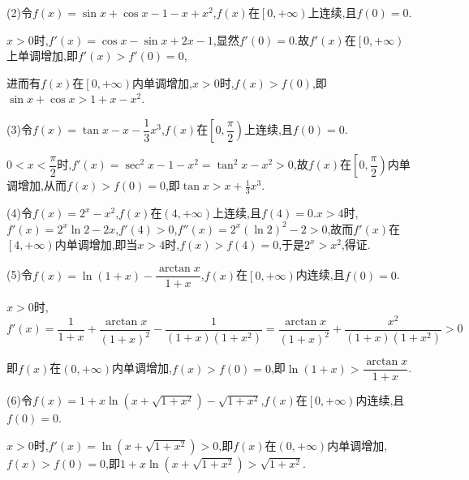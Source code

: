 (2)令$f\left( x \right) = \sin x + \cos x - 1 - x + {x^2}$,$f\left( x \right)$在$\left[ {0, + \infty } \right)$上连续,且$f\left( 0 \right) = 0$.

$x > 0$时,$f'\left( x \right) = \cos x - \sin x + 2x - 1$,显然$f'\left( 0 \right) = 0$.故$f'\left( x \right)$在$\left[ {0, + \infty } \right)$上单调增加,即$f'\left( x \right) > f'\left( 0 \right) = 0$,

进而有$f\left( x \right)$在$\left[ {0, + \infty } \right)$内单调增加,$x > 0$时,$f\left( x \right) > f\left( 0 \right)$,即$\sin x + \cos x > 1 + x - {x^2}$.

(3)令$f\left( x \right) = \tan x - x - \dfrac{1}{3}{x^3}$,$f(x)$在$\left[ {0,\dfrac{\pi }{2}} \right)$上连续,且$f\left( 0 \right) = 0$.

$0 < x < \dfrac{\pi }{2}$时,$f'\left( x \right) = {\sec ^2}x - 1 - {x^2} = {\tan ^2}x - {x^2} > 0$,故$f(x)$在$\left[ {0,\dfrac{\pi }{2}} \right)$内单调增加,从而$f\left( x \right) > f\left( 0 \right) = 0$,即$\tan x > x + \frac{1}{3}{x^3}$.

(4)令$f\left( x \right) = {2^x} - {x^2}$,$f(x)$在$\left( {4, + \infty } \right)$上连续,且$f\left( 4 \right) = 0$.$x > 4$时,$f'\left( x \right) = {2^x}\ln 2 - 2x$,$f'\left( 4 \right) > 0$,$f''\left( x \right) = {2^x}{\left( {\ln 2} \right)^2} - 2 > 0$,故而$f'\left( x \right)$在$\left[ {4, + \infty } \right)$内单调增加,即当$x > 4$时,$f\left( x \right) > f\left( 4 \right) = 0$,于是${2^x} > {x^2}$,得证.

(5)令$f\left( x \right) = \ln \left( {1 + x} \right) - \dfrac{{\arctan x}}{{1 + x}}$,$f\left( x \right)$在$\left[ {0, + \infty } \right)$内连续,且$f\left( 0 \right) = 0$.

$x > 0$时,$f'\left( x \right) = \dfrac{1}{{1 + x}} + \dfrac{{\arctan x}}{{{{\left( {1 + x} \right)}^2}}} - \dfrac{1}{{\left( {1 + x} \right)\left( {1 + {x^2}} \right)}} = \dfrac{{\arctan x}}{{{{\left( {1 + x} \right)}^2}}} + \dfrac{{{x^2}}}{{\left( {1 + x} \right)\left( {1 + {x^2}} \right)}} > 0$

即$f(x)$在$\left( {0, + \infty } \right)$内单调增加,$f\left( x \right) > f\left( 0 \right) = 0$,即$\ln \left( {1 + x} \right) > \dfrac{{\arctan x}}{{1 + x}}$.

(6)令$f\left( x \right) = 1 + x\ln \left( {x + \sqrt {1 + {x^2}} } \right) - \sqrt {1 + {x^2}} $,$f(x)$在$\left[ {0, + \infty } \right)$内连续,且$f\left( 0 \right) = 0$.

$x > 0$时,$f'\left( x \right) = \ln \left( {x + \sqrt {1 + {x^2}} } \right) > 0$,即$f(x)$在$\left( {0, + \infty } \right)$内单调增加,$f\left( x \right) > f\left( 0 \right) = 0$,即$1 + x\ln \left( {x + \sqrt {1 + {x^2}} } \right) > \sqrt {1 + {x^2}} $.


